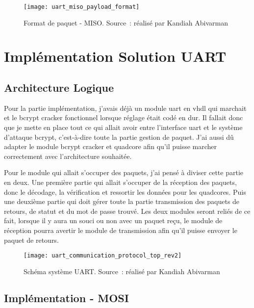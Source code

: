 \begin{figure}[tbph!]
	\centering
	\texttt{[image: uart\_miso\_payload\_format]}
	\caption[Format de paquet - MISO]{Format de paquet - MISO. Source : réalisé par Kandiah Abivarman}
	\label{fig:uart_miso_payload_format}
\end{figure}

\newpage

\section{Implémentation Solution UART}

\subsection{Architecture Logique}

Pour la partie implémentation, j’avais déjà un module \gls{uart} en \gls{vhdl} qui marchait et le bcrypt cracker fonctionnel lorsque réglage était codé en dur. 
Il fallait donc que je mette en place tout ce qui allait avoir entre l’interface \gls{uart} et le système d’attaque bcrypt, c’est-à-dire toute la partie gestion de paquet. 
J’ai aussi dû adapter le module bcrypt cracker et quadcore afin qu’il puisse marcher correctement avec l’architecture souhaitée.

Pour le module qui allait s’occuper des paquets, j’ai pensé à diviser cette partie en deux. 
Une première partie qui allait s’occuper de la réception des paquets, donc le décodage, la vérification et ressortir les données pour les quadcores. 
Puis une deuxième partie qui doit gérer toute la partie transmission des paquets de retours, de statut et du mot de passe trouvé. 
Les deux modules seront reliés de ce fait, lorsque il y aura un souci ou non avec un paquet reçu, le module de réception pourra avertir le module de transmission afin qu’il puisse envoyer le paquet de retours.

\begin{figure}[tbph!]
	\centering
	\texttt{[image: uart\_communication\_protocol\_top\_rev2]}
	\caption[Schéma système UART - FPGA]{Schéma système UART. Source : réalisé par Kandiah Abivarman}
	\label{fig:uart_top_schematics}
\end{figure}


\subsection{Implémentation - MOSI}

